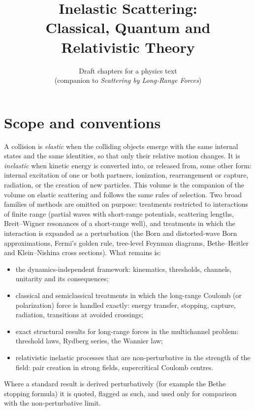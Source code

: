 \documentclass[11pt,a4paper]{book}
\title{Inelastic Scattering:\\[2pt]
       Classical, Quantum and Relativistic Theory}
\author{Draft chapters for a physics text\\
        (companion to \emph{Scattering by Long-Range Forces})}
\date{}
\numberwithin{equation}{chapter}
\begin{document}
\frontmatter
\maketitle
\tableofcontents

\chapter*{Scope and conventions}

A collision is \emph{elastic} when the colliding objects emerge with the same
internal states and the same identities, so that only their relative motion
changes. It is \emph{inelastic} when kinetic energy is converted into, or
released from, some other form: internal excitation of one or both partners,
ionization, rearrangement or capture, radiation, or the creation of new
particles. This volume is the companion of the volume on elastic scattering and
follows the same rules of selection. Two broad families of methods are omitted
on purpose: treatments restricted to interactions of finite range (partial
waves with short-range potentials, scattering lengths, Breit--Wigner
resonances of a short-range well), and treatments in which the interaction is
expanded as a perturbation (the Born and distorted-wave Born approximations,
Fermi's golden rule, tree-level Feynman diagrams, Bethe--Heitler and
Klein--Nishina cross sections). What remains is:
\begin{itemize}
  \item the dynamics-independent framework: kinematics, thresholds, channels,
        unitarity and its consequences;
  \item classical and semiclassical treatments in which the long-range
        Coulomb (or polarization) force is handled exactly: energy transfer,
        stopping, capture, radiation, transitions at avoided crossings;
  \item exact structural results for long-range forces in the multichannel
        problem: threshold laws, Rydberg series, the Wannier law;
  \item relativistic inelastic processes that are non-perturbative in the
        strength of the field: pair creation in strong fields, supercritical
        Coulomb centres.
\end{itemize}
Where a standard result is derived perturbatively (for example the Bethe
stopping formula) it is quoted, flagged as such, and used only for comparison
with the non-perturbative limit.
\end{document}
